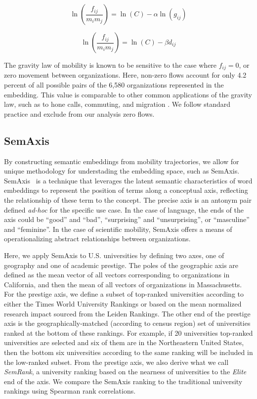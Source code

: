 \documentclass[12pt]{article} %
\begin{document}
\begin{equation}
    \label{eq:linear_flux_geo}
    \ln(\frac{f_{ij}}{m_im_j}) = \ln(C)  - \alpha \ln(g_{ij})
\end{equation}

\begin{equation}
    \label{eq:linear_flux_emb}
    \ln(\frac{f_{ij}}{m_im_j}) = \ln(C) - \beta d_{ij}
\end{equation}

The gravity law of mobility is known to be sensitive to the case where $f_{ij} = 0$, or zero movement between organizations.
Here, non-zero flows account for only 4.2 percent of all possible pairs of  the 6,580 organizations represented in the embedding.
This value is comparable to other common applications of the gravity law, such as to hone calls, commuting, and migration \autocite{simini2012universal}.
We follow standard practice and exclude from our analysis zero flows.


%
%
\subsection*{SemAxis}
By constructing semantic embeddings from mobility trajectories, we allow for unique methodology for understading the embedding space, such as SemAxis.
SemAxis~\autocite{an2018semaxis} is a technique that leverages the latent semantic characteristics of word embeddings to represent the position of terms along a conceptual axis, reflecting the relationship of these term to the concept.
The precise axis is an antonym pair defined \textit{ad-hoc} for the specific use case.
In the case of language, the ends of the axis could be ``good'' and ``bad'', ``surprising'' and ``unsurprising'', or ``masculine'' and ``feminine''.
In the case of scientific mobility, SemAxis offers a means of operationalizing abstract relationships between organizations.

Here, we apply SemAxis to U.S. universities by defining two axes, one of geography and one of academic prestige.
The poles of the geographic axis are defined as the mean vector of all vectors corresponding to organizations in California, and then the mean of all vectors of organizations in Massachusetts.
For the prestige axis, we define a subset of top-ranked universities according to either the Times World University Rankings or based on the mean normalized research impact sourced from the Leiden Rankings.
The other end of the prestige axis is the geographically-matched (according to census region) set of universities ranked at the bottom of these rankings.
For example, if 20 universities top-ranked universities are selected and six of them are in the Northeastern United States, then the bottom six universities according to the same ranking will be included in the low-ranked subset.
From the prestige axis, we also derive what we call \textit{SemRank}, a university ranking based on the nearness of universities to the \textit{Elite} end of the axis.
We compare the SemAxis ranking to the traditional university rankings using Spearman rank correlations.
\end{document}
